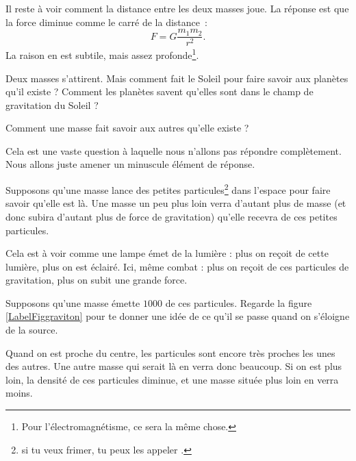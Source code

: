 Il reste à voir comment la distance entre les deux masses joue. La réponse est que la force diminue comme le carré de la distance~:
\begin{equation}
	F=G\frac{ m_1m_2 }{ r^2 }.
\end{equation}
La raison en est subtile, mais assez profonde\footnote{Pour l'électromagnétisme, ce sera la même chose.}. 


\begin{pourquoidonc}
	Deux masses s'attirent. Mais comment fait le Soleil pour faire savoir aux planètes qu'il existe ? Comment les planètes savent qu'elles sont dans le champ de gravitation du Soleil ?

	Comment une masse fait savoir aux autres qu'elle existe ?
\end{pourquoidonc}
Cela est une vaste question à laquelle nous n'allons pas répondre complètement. Nous allons juste amener un minuscule élément de réponse. 

Supposons qu'une masse lance des petites particules\footnote{si tu veux frimer, tu peux les appeler .} dans l'espace pour faire savoir qu'elle est là. Une masse un peu plus loin \og verra\fg{} d'autant plus de masse (et donc subira d'autant plus de force de gravitation) qu'elle recevra de ces petites particules.

Cela est à voir comme une lampe émet de la lumière : plus on reçoit de cette lumière, plus on est éclairé. Ici, même combat : plus on reçoit de ces particules de gravitation, plus on subit une grande force.

Supposons qu'une masse émette $1000$ de ces particules. Regarde la figure \ref{LabelFiggraviton} pour te donner une idée de ce qu'il se passe quand on s'éloigne de la source.
\newcommand{\CaptionFiggraviton}{Les petites particules de gravitation. Plus on s'éloigne, plus elles s'espacent les unes des autres}


Quand on est proche du centre, les particules sont encore très proches les unes des autres. Une autre masse qui serait là en verra donc beaucoup. Si on est plus loin, la densité de ces particules diminue, et une masse située plus loin en verra moins. 

